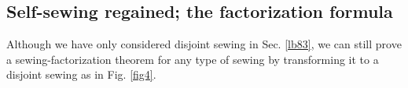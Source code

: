 \documentclass[11pt,b5paper,notitlepage]{article}
\theoremstyle{definition}
\theoremstyle{plain}
\newcommand{\<}{\left\langle}
\renewcommand{\>}{\right\rangle}
\numberwithin{equation}{section}
\begin{document}
\subsection{Self-sewing regained; the factorization formula}

Although we have only considered disjoint sewing in Sec. \ref{lb83}, we can still prove a sewing-factorization theorem for any type of sewing by transforming it to a disjoint sewing as in Fig. \ref{fig4}.

\begin{figure}[h]
	\centering
{}
\end{figure}
\end{document}
